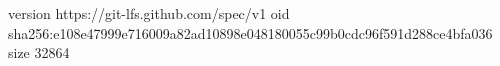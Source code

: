 version https://git-lfs.github.com/spec/v1
oid sha256:e108e47999e716009a82ad10898e048180055c99b0cdc96f591d288ce4bfa036
size 32864
